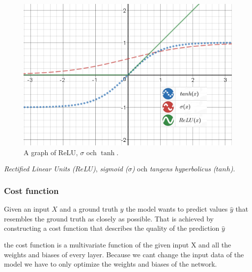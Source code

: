 \documentclass[a4paper,11pt,twoside]{article}
\begin{document}
\begin{figure}[h]
	\centering
  		\includegraphics[scale=0.83]{activationfunction.png}
  	\caption{A graph of ReLU, $\sigma$ och $\tanh$.} \label{activation_function}
\end{figure}

\textit{Rectified Linear Units ($ReLU$)}, \textit{sigmoid ($\sigma$)} och \textit{tangens hyperbolicus ($tanh$)}.

\subsubsection{Cost function}
Given an input $X$ and a ground truth $y$ the model wants to predict values $\hat{y}$ that resembles the ground truth as closely as possible. That is achieved by constructing a cost function that describes the quality of the prediction $\hat{y}$



the cost function is a multivariate function of the given input X and all the weights and biases of every layer. Because we cant change the input data of the model we have to only optimize the weights and biases of the network.
\end{document}

